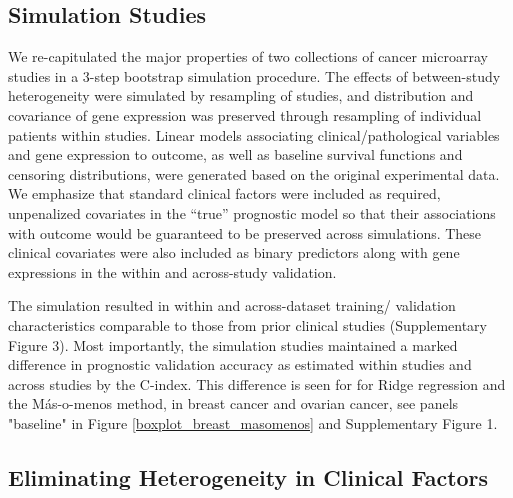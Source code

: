 \documentclass{bioinfo}
\begin{document}
  \subsection{Simulation Studies}

  We re-capitulated the major properties of %
  two collections of cancer microarray studies in a 3-step bootstrap
  simulation procedure. The effects of between-study heterogeneity
  were simulated by resampling of studies, and distribution and
  covariance of gene expression was preserved through resampling of
  individual patients within studies.  Linear models associating
  clinical/pathological variables and gene expression to outcome, as
  well as baseline survival functions and censoring distributions,
  were generated based on the original experimental data.  We
  emphasize that standard clinical factors were included as required,
  unpenalized covariates in the ``true'' prognostic model so that
  their associations with outcome would be guaranteed to be preserved
  across simulations. 
  These clinical covariates were also included as binary predictors along with
  gene expressions in the within and across-study validation.   

  The simulation resulted in within and across-dataset
  training/ validation characteristics comparable to those from prior
  clinical studies (Supplementary Figure 3).  Most importantly, the
  simulation studies maintained a marked difference in prognostic
  validation accuracy as estimated within studies and across studies
  by the C-index. This difference is seen for for Ridge regression 
  and the M\'{a}s-o-menos method, in breast cancer and ovarian cancer, 
  see panels "baseline" in Figure \ref{boxplot_breast_masomenos} and Supplementary Figure 1.



  \subsection{Eliminating Heterogeneity in Clinical Factors}
\end{document}
